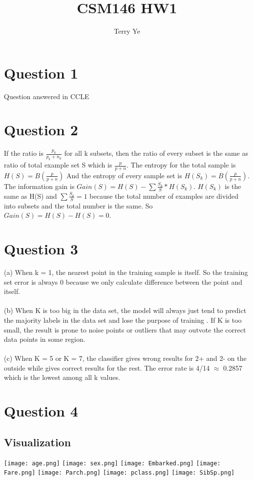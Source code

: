 \documentclass[12pt]{article}
\title{CSM146 HW1}
\author{Terry Ye}
\begin{document}
\maketitle

\section{Question 1}
  Question answered in CCLE
  
\section{Question 2}
  If the ratio is \(\frac{p_k}{p_k+n_k}\) for all k subsets, then the ratio of every subset is the same as ratio of total example set S which is \(\frac{p}{p+n}\). The entropy for the total sample is $H(S) = B(\frac{p}{p+n})$ And the entropy of every sample set is $H(S_k) = B(\frac{p}{p+n})$. 
  The information gain is $Gain(S) = H(S) - \sum \frac{S_k}{S} *H(S_k)$.
  $H(S_k)$ is the same as H(S) and $\sum \frac{S_k}{S} = 1$ because the total number of examples are divided into subsets and the total number is the same.
  So $Gain(S) = H(S) - H(S) = 0$.

\section{Question 3}
    (a) When k = 1, the nearest point in the training sample is itself. So the training set error is always 0 because we only calculate difference between the point and itself.
    \\~\\
    (b) When K is too big in the data set, the model will always just tend to predict the majority labels in the data set and lose the purpose of training . If K is too small, the result is prone to noise points or outliers that may outvote the correct data points in some region.
    \\~\\
    (c) When K = 5 or K = 7, the classifier gives wrong results for 2+ and 2- on the outside while gives correct results for the rest. The error rate is 4/14 \(\approx\) 0.2857 which is the lowest among all k values.

\section{Question 4}
    \subsection{Visualization}
        \texttt{[image: age.png]}
        \texttt{[image: sex.png]}
        \texttt{[image: Embarked.png]}
        \texttt{[image: Fare.png]}
        \texttt{[image: Parch.png]}
        \texttt{[image: pclass.png]}
        \texttt{[image: SibSp.png]}
        
\end{document}
